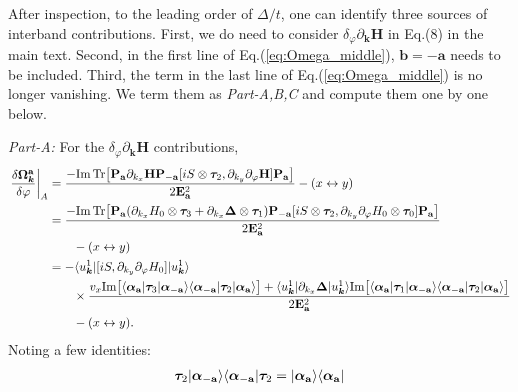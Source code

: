 \begin{subappendices}
After inspection, to the leading order of $\varDelta/t$, one can identify three sources of interband contributions. First, we do need to consider $\delta_\varphi \partial_{\bm{k}} \mathbf H$ in Eq.(8) in the main text. Second, in the first line of Eq.(\ref{eq:Omega_middle}), $\mathbf b=-\mathbf a$ needs to be included. Third, the term in the last line of Eq.(\ref{eq:Omega_middle}) is no longer vanishing. We term them as \emph{Part-A,B,C} and compute them one by one below.

\emph{Part-A:} For the $\delta_\varphi \partial_{\bm{k}} \mathbf H$ contributions, 
\begin{align}
	\left.\frac{\delta\boldsymbol\Omega^{\mathbf a}_{\bm{k}}}{\delta\varphi}\right|_{A} 
    &= \frac{-\mbox{Im\,Tr}\big[\mathbf P_{\mathbf a}\partial_{k_x}\mathbf H \mathbf P_{-\mathbf a} [iS\otimes\boldsymbol\tau_2,\partial_{k_y}\partial_{\varphi}\mathbf H] \mathbf P_{\mathbf a}\big]}{2\mathbf E^2_{\mathbf a}}-(x\leftrightarrow y)\notag\\
	&=\frac{-\mbox{Im\,Tr}\big[\mathbf P_{\mathbf a}(\partial_{k_x}H_0\otimes\boldsymbol\tau_3 +\partial_{k_x}\boldsymbol\Delta\otimes\boldsymbol\tau_1 ) \mathbf P_{-\mathbf a} [iS\otimes\boldsymbol\tau_2,\partial_{k_y}\partial_{\varphi}H_0\otimes\boldsymbol\tau_0] \mathbf P_{\mathbf a}\big]}{2\mathbf E^2_{\mathbf a}}\notag\\
    &\qquad-(x\leftrightarrow y)\notag\\
	&=-\langle u^1_{\bm{k}}|[iS,\partial_{k_y}\partial_{\varphi}H_0]|u^1_{\bm{k}}\rangle\notag\\
    &\qquad\times\frac{v_x\mbox{Im}\big[\langle\boldsymbol\alpha_{\mathbf a}|\boldsymbol\tau_3  |\boldsymbol\alpha_{-\mathbf a}\rangle\langle\boldsymbol\alpha_{-\mathbf a}|\boldsymbol\tau_2 |\boldsymbol\alpha_{\mathbf a}\rangle\big]+\langle u^1_{\bm{k}}|\partial_{k_x}\boldsymbol\Delta|u^1_{\bm{k}}\rangle \mbox{Im}\big[\langle\boldsymbol\alpha_{\mathbf a}|\boldsymbol\tau_1  |\boldsymbol\alpha_{-\mathbf a}\rangle\langle\boldsymbol\alpha_{-\mathbf a}|\boldsymbol\tau_2 |\boldsymbol\alpha_{\mathbf a}\rangle\big]}{2\mathbf E^2_{\mathbf a}}\notag\\
    &\qquad-(x\leftrightarrow y).
\end{align}
Noting a few identities:
\begin{align}
	&\boldsymbol\tau_2|\boldsymbol\alpha_{-\mathbf a}\rangle\langle\boldsymbol\alpha_{-\mathbf a}|\boldsymbol\tau_2=|\boldsymbol\alpha_{\mathbf a}\rangle\langle\boldsymbol\alpha_{\mathbf a}|\notag\\  

\end{align}
\end{subappendices}
